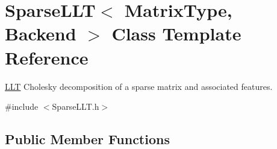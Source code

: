 \hypertarget{class_sparse_l_l_t}{\section{Sparse\-L\-L\-T$<$ Matrix\-Type, Backend $>$ Class Template Reference}
\label{class_sparse_l_l_t}
}


\hyperlink{class_l_l_t}{L\-L\-T} Cholesky decomposition of a sparse matrix and associated features.  




{\ttfamily \#include $<$Sparse\-L\-L\-T.\-h$>$}

\subsection*{Public Member Functions}
